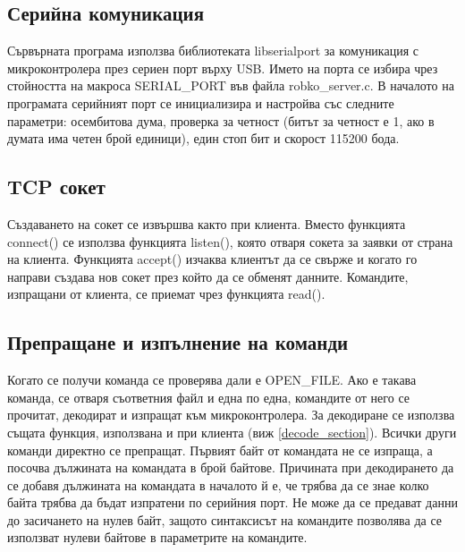 \subsection{Серийна комуникация}
Сървърната програма използва библиотеката libserialport за комуникация с микроконтролера през сериен порт върху USB. Името на порта се избира чрез стойността на макроса SERIAL\_PORT във файла robko\_server.c. В началото на програмата серийният порт се инициализира и настройва със следните параметри: осембитова дума, проверка за четност (битът за четност е 1, ако в думата има четен брой единици), един стоп бит и скорост 115200 бода.
\subsection{TCP сокет}
Създаването на сокет се извършва както при клиента. Вместо функцията connect() се използва функцията listen(), която отваря сокета за заявки от страна на клиента. Функцията accept() изчаква клиентът да се свърже и когато го направи създава нов сокет през който да се обменят данните. Командите, изпращани от клиента, се приемат чрез функцията read().
\subsection{Препращане и изпълнение на команди}
Когато се получи команда се проверява дали е OPEN\_FILE. Ако е такава команда, се отваря съответния файл и една по една, командите от него се прочитат, декодират и изпращат към микроконтролера. За декодиране се използва същата функция, използвана и при клиента (виж \ref{decode_section}). Всички други команди директно се препращат. Първият байт от командата не се изпраща, а посочва дължината на командата в брой байтове. Причината при декодирането да се добавя дължината на командата в началото й е, че трябва да се знае колко байта трябва да бъдат изпратени по серийния порт. Не може да се предават данни до засичането на нулев байт, защото синтаксисът на командите позволява да се използват нулеви байтове в параметрите на командите.
